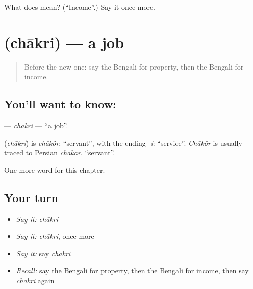 \begin{tcolorbox}[breakable,colback=teal!4,colframe=teal!35!black,title={Before you move on}]
What does  mean? (\textquotedblleft{}Income\textquotedblright{}.) Say it once more.
\end{tcolorbox}
\section[\texorpdfstring{\bn{চাকরি} (chākri)}{চাকরি (chākri)}]{ (chākri) — a job}

\label{lesson:BN-C99-chakri}



\begin{quote}
Before the new one: say the Bengali for property, then the Bengali for income.
\end{quote}

\subsection*{You'll want to know: }
\textbf{} — \emph{chākri} — \textquotedblleft{}a job\textquotedblright{}.

\begin{cousinweb}
\textbf{} (\emph{chākri}) is \emph{chākôr}, \textquotedblleft{}servant\textquotedblright{}, with the ending \emph{-i}: \textquotedblleft{}service\textquotedblright{}. \emph{Chākôr} is usually traced to Persian \emph{chākar}, \textquotedblleft{}servant\textquotedblright{}.
\end{cousinweb}

\begin{grammarlens}[title={What you've built}]
One more word for this chapter.
\end{grammarlens}

\subsection*{Your turn}
\begin{itemize}
\raggedright
  \item \emph{Say it:} \emph{chākri}
  \item \emph{Say it:} \emph{chākri}, once more
  \item \emph{Say it:} say \emph{chākri}
  \item \emph{Recall:} say the Bengali for property, then the Bengali for income, then say \emph{chākri} again
\end{itemize}

